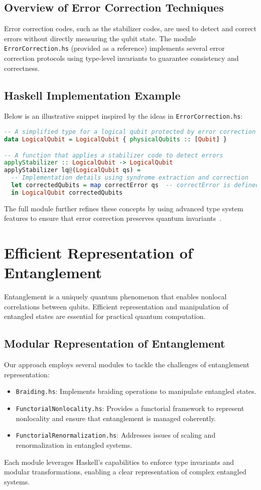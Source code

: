 \documentclass[12pt]{article}
\begin{document}
\subsection{Overview of Error Correction Techniques}
Error correction codes, such as the stabilizer codes, are used to detect and correct errors without directly measuring the qubit state. The module \texttt{ErrorCorrection.hs} (provided as a reference) implements several error correction protocols using type-level invariants to guarantee consistency and correctness.

\subsection{Haskell Implementation Example}
Below is an illustrative snippet inspired by the ideas in \texttt{ErrorCorrection.hs}:
\begin{lstlisting}[language=Haskell]
-- A simplified type for a logical qubit protected by error correction
data LogicalQubit = LogicalQubit { physicalQubits :: [Qubit] }

-- A function that applies a stabilizer code to detect errors
applyStabilizer :: LogicalQubit -> LogicalQubit
applyStabilizer lq@(LogicalQubit qs) = 
  -- Implementation details using syndrome extraction and correction
  let correctedQubits = map correctError qs  -- correctError is defined elsewhere
  in LogicalQubit correctedQubits
\end{lstlisting}
The full module further refines these concepts by using advanced type system features to ensure that error correction preserves quantum invariants~\cite{nielsen2000quantum}.

\section{Efficient Representation of Entanglement}
\label{sec:entanglement}
Entanglement is a uniquely quantum phenomenon that enables nonlocal correlations between qubits. Efficient representation and manipulation of entangled states are essential for practical quantum computation.

\subsection{Modular Representation of Entanglement}
Our approach employs several modules to tackle the challenges of entanglement representation:
\begin{itemize}
    \item \texttt{Braiding.hs}: Implements braiding operations to manipulate entangled states.
    \item \texttt{FunctorialNonlocality.hs}: Provides a functorial framework to represent nonlocality and ensure that entanglement is managed coherently.
    \item \texttt{FunctorialRenormalization.hs}: Addresses issues of scaling and renormalization in entangled systems.
\end{itemize}
Each module leverages Haskell’s capabilities to enforce type invariants and modular transformations, enabling a clear representation of complex entangled systems.
\end{document}
